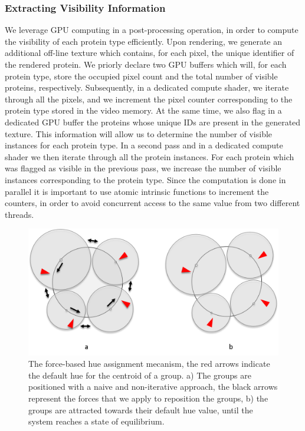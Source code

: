 \documentclass{egpubl}
\begin{document}
	\subsubsection{Extracting Visibility Information}
	\label{sssec:extracting}
	We leverage GPU computing in a post-processing operation, in order to compute the visibility of each protein type efficiently.
	Upon rendering, we generate an additional off-line texture which contains, for each pixel, the unique identifier of the rendered protein.
	We priorly declare two GPU buffers which will, for each protein type, store the occupied pixel count and the total number of visible proteins, respectively.
	Subsequently, in a dedicated compute shader, we iterate through all the pixels, and we increment the pixel counter corresponding to the protein type stored in the video memory.
	At the same time, we also flag in a dedicated GPU buffer the proteins whose unique IDs are present in the generated texture.
	This information will allow us to determine the number of visible instances for each protein type.
	In a second pass and in a dedicated compute shader we then iterate through all the protein instances.
	For each protein which was flagged as visible in the previous pass, we increase the number of visible instances corresponding to the protein type.
	Since the computation is done in parallel it is important to use atomic intrinsic functions to increment the counters, in order to avoid concurrent access to the same value from two different threads.
	
	\begin{figure}
		\centering
		\includegraphics[width=0.85\linewidth]{"Figures/force-based layout"}
		\caption{The force-based hue assignment mecanism, the red arrows indicate the default hue for the centroid of a group. a) The groups are positioned with a naive and non-iterative approach, the black arrows represent the forces that we apply to reposition the groups, b) the groups are attracted towards their default hue value, until the system reaches a state of equilibrium.}
		\label{fig:force-basedlayout}
	\end{figure}
	
\end{document}
